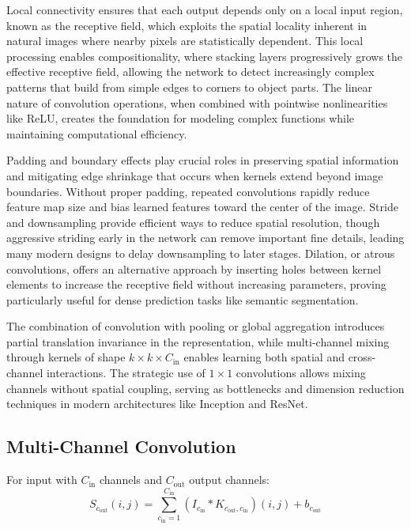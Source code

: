 Local connectivity ensures that each output depends only on a local input region, known as the receptive field, which exploits the spatial locality inherent in natural images where nearby pixels are statistically dependent. This local processing enables compositionality, where stacking layers progressively grows the effective receptive field, allowing the network to detect increasingly complex patterns that build from simple edges to corners to object parts. The linear nature of convolution operations, when combined with pointwise nonlinearities like ReLU, creates the foundation for modeling complex functions while maintaining computational efficiency.

Padding and boundary effects play crucial roles in preserving spatial information and mitigating edge shrinkage that occurs when kernels extend beyond image boundaries. Without proper padding, repeated convolutions rapidly reduce feature map size and bias learned features toward the center of the image. Stride and downsampling provide efficient ways to reduce spatial resolution, though aggressive striding early in the network can remove important fine details, leading many modern designs to delay downsampling to later stages. Dilation, or atrous convolutions, offers an alternative approach by inserting holes between kernel elements to increase the receptive field without increasing parameters, proving particularly useful for dense prediction tasks like semantic segmentation.

The combination of convolution with pooling or global aggregation introduces partial translation invariance in the representation, while multi-channel mixing through kernels of shape \(k\times k\times C_{\text{in}}\) enables learning both spatial and cross-channel interactions. The strategic use of $1\times1$ convolutions allows mixing channels without spatial coupling, serving as bottlenecks and dimension reduction techniques in modern architectures like Inception and ResNet.\cite{GoodfellowEtAl2016,Prince2023,Krizhevsky2012,He2016}

\subsection{Multi-Channel Convolution}

For input with $C_{\text{in}}$ channels and $C_{\text{out}}$ output channels:
\begin{equation}
S_{c_{\text{out}}}(i,j) = \sum_{c_{\text{in}}=1}^{C_{\text{in}}} (I_{c_{\text{in}}} * K_{c_{\text{out}}, c_{\text{in}}})(i,j) + b_{c_{\text{out}}}
\end{equation}

